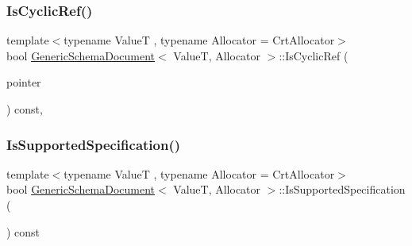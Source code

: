 \mbox{\label{classGenericSchemaDocument_ab3c0518a161f39dea52280e5ebb97e51}} 
\subsubsection{\texorpdfstring{Is\+Cyclic\+Ref()}{IsCyclicRef()}}
{\footnotesize\ttfamily template$<$typename ValueT , typename Allocator  = Crt\+Allocator$>$ \\
bool \hyperlink{classGenericSchemaDocument}{Generic\+Schema\+Document}$<$ ValueT, Allocator $>$\+::Is\+Cyclic\+Ref (\begin{DoxyParamCaption}\item[{const \hyperlink{classGenericSchemaDocument_aeb62f562d4dc024402b00f97cbcef747}{Pointer\+Type} \&}]{pointer }\end{DoxyParamCaption}) const\hspace{0.3cm}{\ttfamily [inline]}, {\ttfamily [private]}}

\mbox{\label{classGenericSchemaDocument_ad4869fab7911c5680a2aedc7f6a6b1c0}} 
\subsubsection{\texorpdfstring{Is\+Supported\+Specification()}{IsSupportedSpecification()}}
{\footnotesize\ttfamily template$<$typename ValueT , typename Allocator  = Crt\+Allocator$>$ \\
bool \hyperlink{classGenericSchemaDocument}{Generic\+Schema\+Document}$<$ ValueT, Allocator $>$\+::Is\+Supported\+Specification (\begin{DoxyParamCaption}{ }\end{DoxyParamCaption}) const\hspace{0.3cm}{\ttfamily [inline]}}

\mbox{\label{classGenericSchemaDocument_a5f3a7cedd15e3568776af2f47df0fb66}} 

